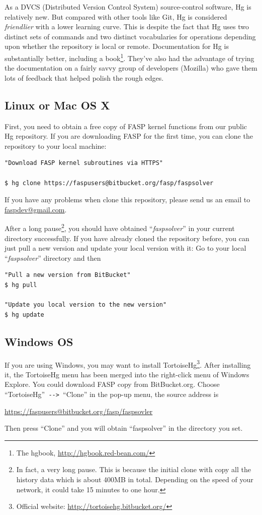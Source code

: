 \documentclass[11pt]{memoir}
\begin{document}
As a DVCS (Distributed Version Control System) source-control
software, Hg is relatively new. But compared with other tools like
Git, Hg is considered \emph{friendlier} with a lower learning
curve. This is despite the fact that Hg uses two distinct sets of
commands and two distinct vocabularies for operations depending upon
whether the repository is local or remote.  Documentation for Hg is
substantially better, including a book\footnote{The hgbook,
  \url{http://hgbook.red-bean.com/}}. They've also had the advantage
of trying the documentation on a fairly savvy group of developers
(Mozilla) who gave them lots of feedback that helped polish the rough
edges.

\subsection{Linux or Mac OS X}
First, you need to obtain a free copy of FASP kernel functions from
our public Hg repository. If you are downloading FASP for the first
time, you can clone the repository to your local machine:
%
\begin{lstlisting}[numbers=none]
"Download FASP kernel subroutines via HTTPS"

$ hg clone https://faspusers@bitbucket.org/fasp/faspsolver
\end{lstlisting}
%
\begin{snugshade}\noindent
If you have any problems when clone this repository, please send us an email to \url{faspdev@gmail.com}.
\end{snugshade}

After a long pause\footnote{In fact, a very long pause. This is
  because the initial clone with copy all the history data which is
  about 400MB in total. Depending on the speed of your network, it
  could take 15 minutes to one hour.}, you should have obtained
``\emph{faspsolver}'' in your current directory successfully. If you
have already cloned the repository before, you can just pull a new
version and update your local version with it: Go to your local
``\emph{faspsolver}'' directory and then
%
\begin{lstlisting}[numbers=none]
"Pull a new version from BitBucket"
$ hg pull

"Update you local version to the new version"
$ hg update
\end{lstlisting}
%

\subsection{Windows OS}
If you are using Windows, you may want to install
TortoiseHg\footnote{Official website:
  \url{http://tortoisehg.bitbucket.org/}}. After installing it, the
TortoiseHg menu has been merged into the right-click menu of Windows
Explore. You could download FASP copy from BitBucket.org. Choose
``TortoiseHg''\verb| --> |``Clone'' in the pop-up menu, the source
address is
\begin{center}
\url{https://faspusers@bitbucket.org/fasp/faspsovler}
\end{center}
Then press ``Clone'' and you will obtain ``faspsolver'' in the directory you set.
\end{document}
